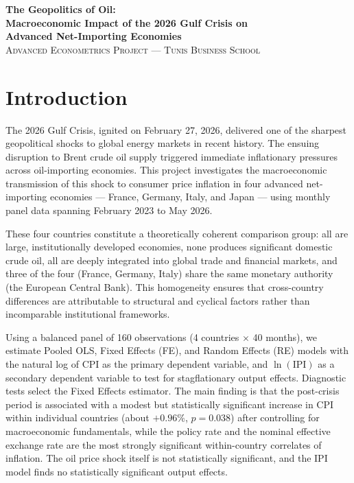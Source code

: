 \documentclass[11pt,a4paper]{article}
\let\oldsection\section
\renewcommand{\section}{\Needspace{6\baselineskip}\oldsection}
\begin{document}
\begin{center}
  {\Large\bfseries\color{navy} The Geopolitics of Oil:\\[2pt]
  Macroeconomic Impact of the 2026 Gulf Crisis on\\[2pt]
  Advanced Net-Importing Economies}\\[6pt]
  {\small\scshape Advanced Econometrics Project --- Tunis Business School}
\end{center}
\vspace{4pt}

\tableofcontents
\newpage

\section{Introduction}
The 2026 Gulf Crisis, ignited on February 27, 2026, delivered one of the sharpest geopolitical shocks to global energy markets in recent history. The ensuing disruption to Brent crude oil supply triggered immediate inflationary pressures across oil-importing economies. This project investigates the macroeconomic transmission of this shock to consumer price inflation in four advanced net-importing economies --- France, Germany, Italy, and Japan --- using monthly panel data spanning February 2023 to May 2026.

These four countries constitute a theoretically coherent comparison group: all are large, institutionally developed economies, none produces significant domestic crude oil, all are deeply integrated into global trade and financial markets, and three of the four (France, Germany, Italy) share the same monetary authority (the European Central Bank). This homogeneity ensures that cross-country differences are attributable to structural and cyclical factors rather than incomparable institutional frameworks.

Using a balanced panel of 160 observations (4 countries $\times$ 40 months), we estimate Pooled OLS, Fixed Effects (FE), and Random Effects (RE) models with the natural log of CPI as the primary dependent variable, and $\ln(\text{IPI})$ as a secondary dependent variable to test for stagflationary output effects. Diagnostic tests select the Fixed Effects estimator. The main finding is that the post-crisis period is associated with a modest but statistically significant increase in CPI within individual countries (about $+0.96\%$, $p=0.038$) after controlling for macroeconomic fundamentals, while the policy rate and the nominal effective exchange rate are the most strongly significant within-country correlates of inflation. The oil price shock itself is not statistically significant, and the IPI model finds no statistically significant output effects.
\end{document}
